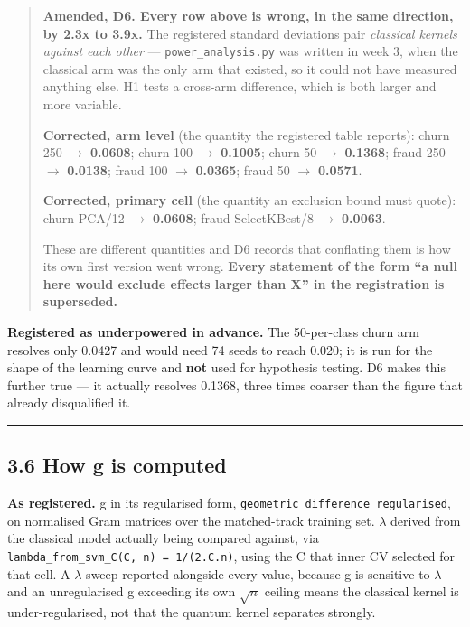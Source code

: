 \documentclass[
  10pt,
]{article}
\begin{document}
\begin{quote}
\textbf{Amended, D6. Every row above is wrong, in the same direction, by
2.3x to 3.9x.} The registered standard deviations pair \emph{classical
kernels against each other} --- \texttt{power\_\allowbreak{}analysis.py} was written
in week 3, when the classical arm was the only arm that existed, so it
could not have measured anything else. H1 tests a cross-arm difference,
which is both larger and more variable.

\textbf{Corrected, arm level} (the quantity the registered table
reports): churn 250 \(\to\) \textbf{0.0608}; churn 100 \(\to\)
\textbf{0.1005}; churn 50 \(\to\) \textbf{0.1368}; fraud 250 \(\to\)
\textbf{0.0138}; fraud 100 \(\to\) \textbf{0.0365}; fraud 50 \(\to\)
\textbf{0.0571}.

\textbf{Corrected, primary cell} (the quantity an exclusion bound must
quote): churn PCA/12 \(\to\) \textbf{0.0608}; fraud SelectKBest/8
\(\to\) \textbf{0.0063}.

These are different quantities and D6 records that conflating them is
how its own first version went wrong. \textbf{Every statement of the
form ``a null here would exclude effects larger than X'' in the
registration is superseded.}
\end{quote}

\textbf{Registered as underpowered in advance.} The 50-per-class churn
arm resolves only 0.0427 and would need 74 seeds to reach 0.020; it is
run for the shape of the learning curve and \textbf{not} used for
hypothesis testing. D6 makes this further true --- it actually resolves
0.1368, three times coarser than the figure that already disqualified
it.

\begin{center}\rule{0.5\linewidth}{0.5pt}\end{center}

\subsection{3.6 How g is computed}\label{how-g-is-computed}

\textbf{As registered.} g in its regularised form,
\texttt{geometric\_\allowbreak{}difference\_\allowbreak{}regularised}, on normalised Gram matrices
over the matched-track training set. \(\lambda\) derived from the
classical model actually being compared against, via
\texttt{lambda\_\allowbreak{}from\_\allowbreak{}svm\_\allowbreak{}C(C,\ n)\ =\ 1/\allowbreak{}(2.C.n)}, using the C that
inner CV selected for that cell. A \(\lambda\) sweep reported alongside
every value, because g is sensitive to \(\lambda\) and an unregularised
g exceeding its own \(\sqrt{n}\) ceiling means the classical kernel is
under-regularised, not that the quantum kernel separates strongly.
\end{document}
